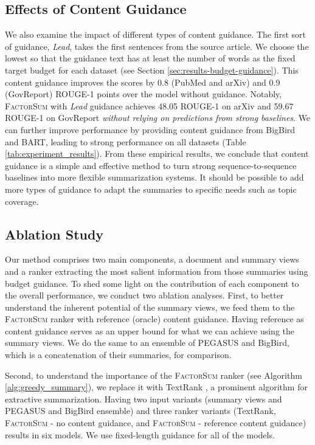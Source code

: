 \documentclass[11pt,table]{article}
\newcommand{\modelname}{FactorSum}
\begin{document}
\subsection{Effects of Content Guidance}
\label{sec:results_content_guidance}
We also examine the impact of different types of content guidance. The first sort of guidance, \emph{Lead}, takes the first  sentences from the source article. We choose the lowest  so that the guidance text has at least the number of words as the fixed target budget for each dataset (see Section \ref{sec:results-budget-guidance}). This content guidance improves the scores by 0.8 (PubMed and arXiv) and 0.9 (GovReport) ROUGE-1 points over the model without guidance. Notably, \textsc{\modelname} with \emph{Lead} guidance achieves 48.05 ROUGE-1 on arXiv and 59.67 ROUGE-1 on GovReport \emph{without relying on predictions from strong baselines}. We can further improve performance by providing content guidance from BigBird and BART, leading to strong performance on all datasets (Table \ref{tab:experiment_results}). From these empirical results, we conclude that content guidance is a simple and effective method to turn strong sequence-to-sequence baselines into more flexible summarization systems. It should be possible to add more types of guidance to adapt the summaries to specific needs such as topic coverage.

\subsection{Ablation Study}

Our method comprises two main components, a document and summary views and a ranker extracting the most salient information from those summaries using budget guidance. To shed some light on the contribution of each component to the overall performance, we conduct two ablation analyses. First, to better understand the inherent potential of the summary views, we feed them to the \textsc{\modelname} ranker with reference (oracle) content guidance. Having reference as content guidance serves as an upper bound  for what we can achieve using the summary views. We do the same to an ensemble of PEGASUS and BigBird, which is a concatenation of their summaries, for comparison.

Second, to understand the importance of the \textsc{\modelname} ranker (see Algorithm \ref{alg:greedy_summary}), we replace it with TextRank \cite{mihalcea2004textrank}, a prominent algorithm for extractive summarization. Having two input variants (summary views and PEGASUS and BigBird ensemble) and three ranker variants (TextRank, \textsc{\modelname} - no content guidance, and \textsc{\modelname} - reference content guidance) results in six models. We use fixed-length guidance for all of the models.
\end{document}
